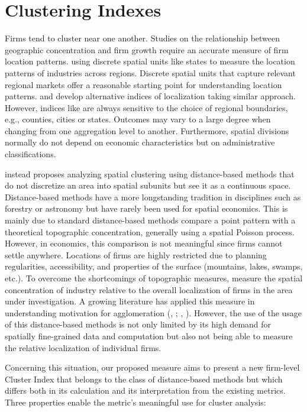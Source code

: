 \documentclass[12pt]{article}
\begin{document}
\section*{Clustering Indexes}
Firms tend to cluster near one another. Studies on the relationship between geographic concentration and firm growth require an accurate measure of firm location patterns.  \cite{ellison1997geographic} using discrete spatial units like states to measure the location patterns of industries across regions. Discrete spatial units that capture relevant regional markets offer a reasonable starting point for understanding location patterns. \cite{maurel1999measure} and \cite{devereux2004geographic} develop alternative indices of localization taking similar approach. However, indices like \cite{ellison1997geographic} are always sensitive to the choice of regional boundaries, e.g., counties, cities or states. Outcomes
may vary to a large degree when changing from
one aggregation level to another. Furthermore,
spatial divisions normally do not depend on economic characteristics but on administrative classifications.


\cite{duranton2005testing} instead proposes analyzing spatial clustering using distance-based methods that do not discretize an area into spatial subunits but see it as a continuous space. Distance-based methods have a more longstanding tradition in disciplines such as forestry or astronomy but have rarely been used for spatial economics. This is mainly due to standard distance-based methods compare a point pattern with a theoretical topographic concentration, generally using a spatial Poisson process. However, in economics, this comparison is not meaningful since firms cannot settle anywhere. Locations of firms are highly restricted due to planning regularities, accessibility, and properties of the surface (mountains, lakes, swamps, etc.). To overcome the shortcomings of topographic measures, \cite{duranton2005testing} measure the spatial concentration of industry relative to the overall localization of firms in the area under investigation.
A growing literature has applied this measure in understanding motivation for agglomeration (\citeauthor{ellison2010causes}, \citeyear{ellison2010causes}; \citeauthor{alfaro2014global}, \citeyear{alfaro2014global}). However, the use of the usage of this distance-based methods is not only limited by its high demand for spatially fine-grained data and computation but also not being able to measure the relative localization of individual firms.

Concerning this situation, our proposed measure aims to present a new firm-level Cluster Index that belongs to the class of distance-based methods but which differs both in its calculation and its interpretation from the existing \cite{duranton2005testing} metrics. Three properties enable the metric’s meaningful use for cluster analysis:
\end{document}
